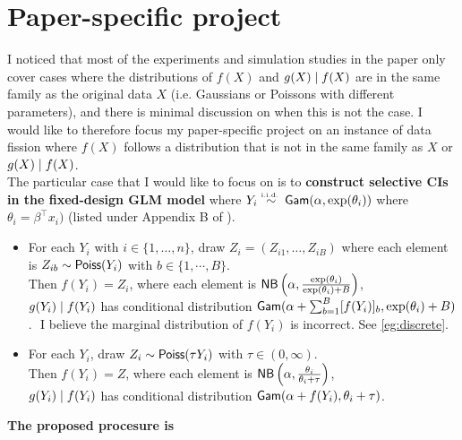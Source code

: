 \section{Paper-specific project}
I noticed that most of the experiments and simulation studies in the paper only cover cases where the distributions of $f(X)$ and $g(X)\mid f(X)$ are in the same family as the original data $X$ (i.e. Gaussians or Poissons with different parameters), and there is minimal discussion on when this is not the case. I would like to therefore focus my paper-specific project on an instance of data fission where $f(X)$ follows a distribution that is not in the same family as $X$ or $g(X)\mid f(X)$.\\

The particular case that I would like to focus on is to \textbf{construct selective CIs in the fixed-design GLM model} where $Y_i \overset{\textrm{\tiny i.i.d.\ }}{\sim} {\sf{Gam}}(\alpha, \exp(\theta_i))$ where $\theta_i=\beta^\top x_i)$ (listed under Appendix B of \cite{leiner2022data}).

\begin{itemize}
\item For each $Y_i$ with $i\in\{1,\dots,n\}$, draw $Z_i=(Z_{i1}, \dots, Z_{iB})$ where each element is \iid $Z_{ib} \sim {\sf{Poiss}}(Y_i)$ with $b\in\{1,\cdots,B\}$.\\
Then $f(Y_i) = Z_i$, where each element is \iid ${\sf{NB}}\left(\alpha, \frac{\exp(\theta_i)}{\exp(\theta_i)+B}\right)$,\\
$g(Y_i) \mid f(Y_i)$ has conditional distribution ${\sf{Gam}}(\alpha+\sum_{b=1}^B [f(Y_i)]_b, \exp(\theta_i) + B)$.
\newline$ $
\color{red}
I believe the marginal distribution of $f(Y_i)$ is incorrect. See \cref{eg:discrete}.
\color{black}

\item For each $Y_i$, draw $Z_i \sim {\sf{Poiss}}(\tau Y_i)$ with $\tau\in(0,\infty)$.\\
Then $f(Y_i) = Z$, where each element is \iid ${\sf{NB}}\left(\alpha, \frac{\theta_i}{\theta_i+\tau}\right)$,\\
$g(Y_i) \mid f(Y_i)$ has conditional distribution ${\sf{Gam}}(\alpha+f(Y_i), \theta_i + \tau)$.
\end{itemize}

\textbf{The proposed procesure is}

